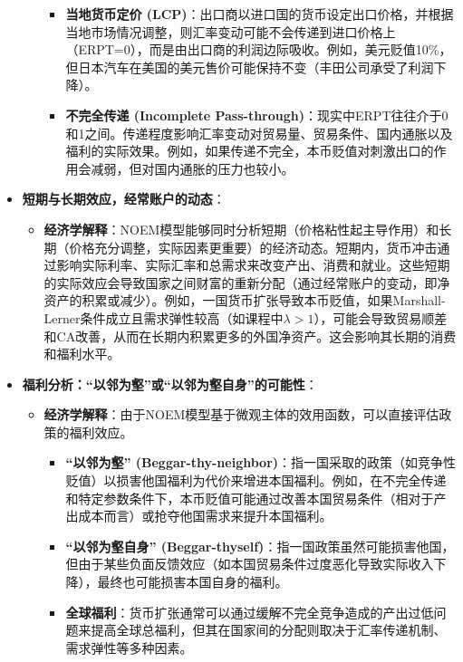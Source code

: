 \documentclass[12pt]{article}
\begin{document}
\begin{itemize}
\begin{itemize}
\begin{itemize}
            \item \textbf{当地货币定价 (LCP)}：出口商以进口国的货币设定出口价格，并根据当地市场情况调整，则汇率变动可能不会传递到进口价格上（ERPT=0），而是由出口商的利润边际吸收。例如，美元贬值10\%，但日本汽车在美国的美元售价可能保持不变（丰田公司承受了利润下降）。
            \item \textbf{不完全传递 (Incomplete Pass-through)}：现实中ERPT往往介于0和1之间。传递程度影响汇率变动对贸易量、贸易条件、国内通胀以及福利的实际效果。例如，如果传递不完全，本币贬值对刺激出口的作用会减弱，但对国内通胀的压力也较小。
        \end{itemize}
    \end{itemize}
    \item \textbf{短期与长期效应，经常账户的动态}：
    \begin{itemize}
        \item \textbf{经济学解释}：NOEM模型能够同时分析短期（价格粘性起主导作用）和长期（价格充分调整，实际因素更重要）的经济动态。短期内，货币冲击通过影响实际利率、实际汇率和总需求来改变产出、消费和就业。这些短期的实际效应会导致国家之间财富的重新分配（通过经常账户的变动，即净资产的积累或减少）。例如，一国货币扩张导致本币贬值，如果Marshall-Lerner条件成立且需求弹性较高（如课程中$\lambda > 1$），可能会导致贸易顺差和CA改善，从而在长期内积累更多的外国净资产。这会影响其长期的消费和福利水平。
    \end{itemize}
    \item \textbf{福利分析：“以邻为壑”或“以邻为壑自身”的可能性}：
    \begin{itemize}
        \item \textbf{经济学解释}：由于NOEM模型基于微观主体的效用函数，可以直接评估政策的福利效应。
        \begin{itemize}
            \item \textbf{“以邻为壑” (Beggar-thy-neighbor)}：指一国采取的政策（如竞争性贬值）以损害他国福利为代价来增进本国福利。例如，在不完全传递和特定参数条件下，本币贬值可能通过改善本国贸易条件（相对于产出成本而言）或抢夺他国需求来提升本国福利。
            \item \textbf{“以邻为壑自身” (Beggar-thyself)}：指一国政策虽然可能损害他国，但由于某些负面反馈效应（如本国贸易条件过度恶化导致实际收入下降），最终也可能损害本国自身的福利。
            \item \textbf{全球福利}：货币扩张通常可以通过缓解不完全竞争造成的产出过低问题来提高全球总福利，但其在国家间的分配则取决于汇率传递机制、需求弹性等多种因素。
        \end{itemize}
    \end{itemize}
\end{itemize}
\end{document}

